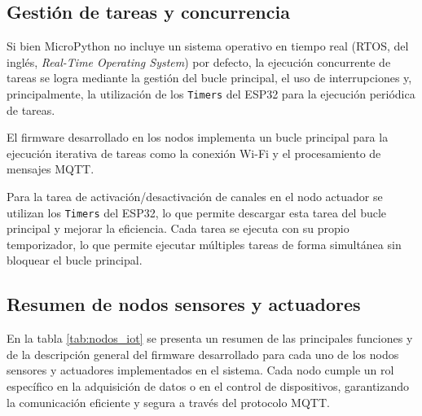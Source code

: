 \subsection{Gestión de tareas y concurrencia}

Si bien MicroPython no incluye un sistema operativo en tiempo real (RTOS, del
inglés, \textit{Real-Time Operating System}) por defecto, la ejecución
concurrente de tareas se logra mediante la gestión del bucle principal, el uso
de interrupciones y, principalmente, la utilización de los \texttt{Timers} del
ESP32 para la ejecución periódica de tareas.

El firmware desarrollado en los nodos implementa un bucle principal para la
ejecución iterativa de tareas como la conexión Wi-Fi y el procesamiento de
mensajes MQTT.

Para la tarea de activación/desactivación de canales en el nodo actuador se
utilizan los \texttt{Timers} del ESP32, lo que permite descargar esta tarea del
bucle principal y mejorar la eficiencia. Cada tarea se ejecuta con su propio
temporizador, lo que permite ejecutar múltiples tareas de forma simultánea sin
bloquear el bucle principal.


\subsection{Resumen de nodos sensores y actuadores}

En la tabla \ref{tab:nodos_iot} se presenta un resumen de las principales
funciones y de la descripción general del firmware desarrollado para cada uno
de los nodos sensores y actuadores implementados en el sistema. Cada nodo
cumple un rol específico en la adquisición de datos o en el control de
dispositivos, garantizando la comunicación eficiente y segura a través del
protocolo MQTT.

